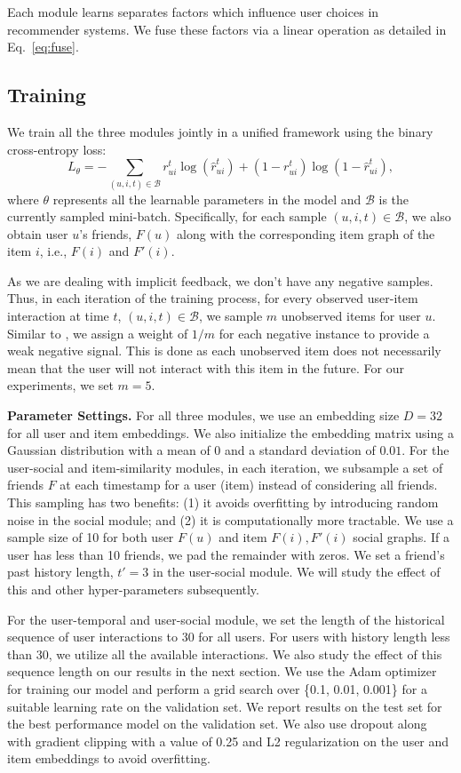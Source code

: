 Each module learns separates factors which influence user choices in recommender systems. We fuse these factors via a linear operation as detailed in Eq.~\eqref{eq:fuse}.

\subsection{Training}
We train all the three modules jointly in a unified framework using the binary cross-entropy loss:
\begin{equation}
L_{\theta} = - \sum\limits_{(u,i,t) \in \mathcal{B}}r_{ui}^t \log \left( \hat{r}_{ui}^t \right) + \left ( 1-r_{ui}^t \right ) \log \left ( 1-\hat{r}_{ui}^t \right) ,
\end{equation}
where $\theta$ represents all the learnable parameters in the model and $\mathcal{B}$ is the currently sampled mini-batch.
Specifically, for each sample $(u,i,t) \in \mathcal{B}$, we also obtain user $u$'s friends, $F(u)$ along with the corresponding item graph of the item $i$, i.e., $F(i)$ and $F'(i)$.

As we are dealing with implicit feedback, we don't have any negative samples. Thus, in each iteration of the training process, for every observed user-item interaction at time $t$, $(u,i,t) \in \mathcal{B}$, we sample $m$ unobserved items for user $u$.
Similar to \citet{Song:2019}, we assign a weight of $1/m$ for each negative instance to provide a weak negative signal. This is done as each unobserved item does not necessarily mean that the user will not interact with this item in the future. For our experiments, we set $m=5$.

\noindent
\textbf{Parameter Settings.}
For all three modules, we use an embedding size $D = 32$ for all user and item embeddings. We also initialize the embedding matrix using a Gaussian distribution with a mean of 0 and a standard deviation of $0.01$. For the user-social and item-similarity modules, in each iteration, we subsample a set of friends $F$ at each timestamp for a user (item) instead of considering all friends. This sampling has two benefits: (1) it avoids overfitting by introducing random noise in the social module; and (2) it is computationally more tractable. We use a sample size of 10 for both user $F(u)$ and item $F(i), F'(i)$ social graphs. If a user has less than 10 friends, we pad the remainder with zeros. We set a friend's past history length, $t' =  3$ in the user-social module. We will study the effect of this  and other hyper-parameters subsequently.

For the user-temporal and user-social module, we set the length of the historical sequence of user interactions to $30$ for all users. For users with history length less than $30$, we utilize all the available interactions.
We also study the effect of this sequence length on our results in the next section.
We use the Adam optimizer for training our model and perform a grid search over \{0.1, 0.01, 0.001\} for a suitable learning rate on the validation set. We report results on the test set for the best performance model on the validation set. We also use dropout along with gradient clipping with a value of 0.25 and L2 regularization on the user and item embeddings to avoid overfitting.
